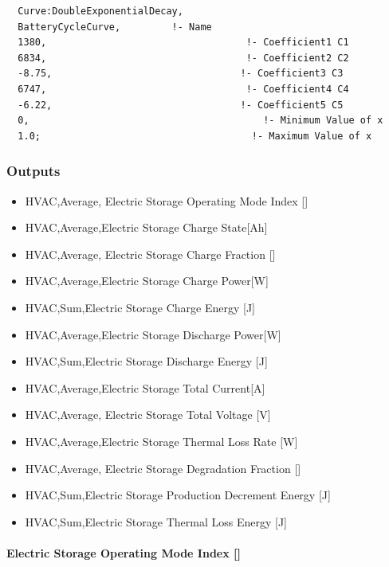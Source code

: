 \begin{lstlisting}
  Curve:DoubleExponentialDecay,
  BatteryCycleCurve,         !- Name
  1380,                                   !- Coefficient1 C1
  6834,                                   !- Coefficient2 C2
  -8.75,                                 !- Coefficient3 C3
  6747,                                   !- Coefficient4 C4
  -6.22,                                 !- Coefficient5 C5
  0,                                         !- Minimum Value of x
  1.0;                                     !- Maximum Value of x
\end{lstlisting}

\subsubsection{Outputs}\label{electricloadcenter-storagebattery-outputs}

\begin{itemize}
\item
  HVAC,Average, Electric Storage Operating Mode Index {[]}
\item
  HVAC,Average,Electric Storage Charge State{[}Ah{]}
\item
  HVAC,Average, Electric Storage Charge Fraction {[]}
\item
  HVAC,Average,Electric Storage Charge Power{[}W{]}
\item
  HVAC,Sum,Electric Storage Charge Energy {[}J{]}
\item
  HVAC,Average,Electric Storage Discharge Power{[}W{]}
\item
  HVAC,Sum,Electric Storage Discharge Energy {[}J{]}
\item
  HVAC,Average,Electric Storage Total Current{[}A{]}
\item
  HVAC,Average, Electric Storage Total Voltage {[}V{]}
\item
  HVAC,Average,Electric Storage Thermal Loss Rate {[}W{]}
\item
  HVAC,Average, Electric Storage Degradation Fraction {[]}
\item
  HVAC,Sum,Electric Storage Production Decrement Energy {[}J{]}
\item
  HVAC,Sum,Electric Storage Thermal Loss Energy {[}J{]}
\end{itemize}

\paragraph{Electric Storage Operating Mode Index {[]}}\label{electric-storage-operating-mode-index}

